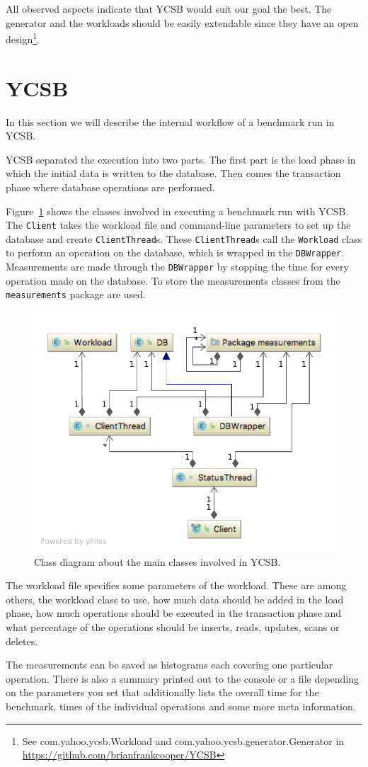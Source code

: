 All observed aspects indicate that YCSB would suit our goal the best.
The generator and the workloads should be easily extendable since they have an open design\footnote{See com.yahoo.ycsb.Workload and com.yahoo.ycsb.generator.Generator in \url{https://github.com/brianfrankcooper/YCSB}}.

\section{YCSB}
\label{ch:analysis:se:ycsb}
In this section we will describe the internal workflow of a benchmark run in YCSB.

YCSB separated the execution into two parts.
The first part is the load phase in which the initial data is written to the database.
Then comes the transaction phase where database operations are performed.

Figure~\ref{fig:basicYCSBWorkflow} shows the classes involved in executing a benchmark run with YCSB.
The \texttt{Client} takes the workload file and command-line parameters to set up the database and create \texttt{ClientThread}s.
These \texttt{ClientThread}s call the \texttt{Workload} class to perform an operation on the database,
which is wrapped in the \texttt{DBWrapper}.
Measurements are made through the \texttt{DBWrapper} by stopping the time for every operation made on the database.
To store the measurements classes from the \texttt{measurements} package are used.

\begin{figure}
  \centering
  \includegraphics[width=.75\textwidth]{images/benchmarks/basicYCSBWorkflow}
  \caption{Class diagram about the main classes involved in YCSB.}
  \label{fig:basicYCSBWorkflow}
\end{figure}

The workload file specifies some parameters of the workload.
These are among others,
the workload class to use,
how much data should be added in the load phase,
how much operations should be executed in the transaction phase and what percentage of the operations should be inserts, reads, updates, scans or deletes.

The measurements can be saved as histograms each covering one particular operation.
There is also a summary printed out to the console or a file depending on the parameters you set that additionally lists the overall time for the benchmark, times of the individual operations and some more meta information.
